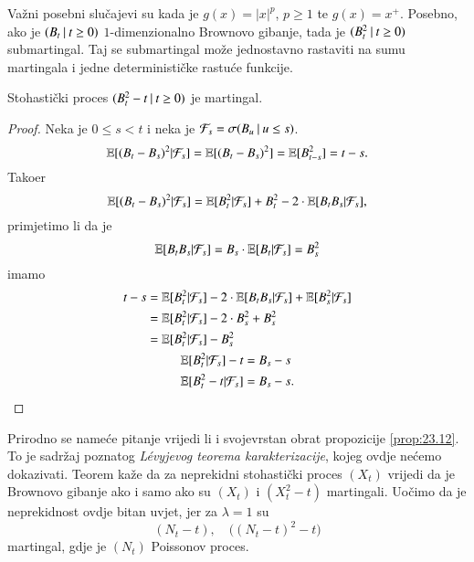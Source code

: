 Va\v zni posebni slu\v cajevi su kada je $g(x) = |x|^p$, $p \geq 1$ te $g(x) = x^+$.
Posebno, ako je $({B_t} \: | \: {t \geq 0})$ $1$-dimenzionalno Brownovo gibanje, tada je $({B_t^2} \: | \: {t \geq 0})$ submartingal.
Taj se submartingal mo\v ze jednostavno rastaviti na sumu martingala i jedne deterministi\v cke rastu\' ce funkcije.

\begin{prop}    \label{prop:23.12}
    Stohasti\v cki proces $({B_t^2 - t} \: | \: {t \geq 0})$ je martingal.
\end{prop}

\begin{proof}
    Neka je $0 \leq s < t$ i neka je $\mathcal{F}_s = \sigma({B_u} \: | \: {u \leq s})$.
    \begin{equation*}
        \mathbb{E} [ (B_t - B_s)^2 | \mathcal{F}_s] = \mathbb{E} [(B_t - B_s)^2] = \mathbb{E} [B_{t - s}^2] = t - s.
    \end{equation*}
    Tako\dj er
    \begin{equation*}
        \mathbb{E} [(B_t - B_s)^2 | \mathcal{F}_s] = \mathbb{E} [B_t^2 | \mathcal{F}_s] + B_t^2 - 2 \cdot \mathbb{E} [B_t B_s | \mathcal{F}_s],
    \end{equation*}
    primjetimo li da je
    \begin{equation*}
        \mathbb{E} [B_t B_s | \mathcal{F}_s] = B_s \cdot \mathbb{E} [B_t | \mathcal{F}_s] = B_s^2
    \end{equation*}
    imamo
    \begin{equation*}
        \begin{gathered}
            \begin{aligned}
                t - s &= \mathbb{E} [B_t^2 | \mathcal{F}_s] - 2 \cdot \mathbb{E} [B_t B_s | \mathcal{F}_s] + \mathbb{E} [B_s^2 | \mathcal{F}_s]\\
                &= \mathbb{E} [B_t^2 | \mathcal{F}_s] - 2 \cdot B_s^2 + B_s^2\\
                &= \mathbb{E} [B_t^2 | \mathcal{F}_s] - B_s^2
            \end{aligned}\\
            \begin{aligned}
                \mathbb{E} [B_t^2 | \mathcal{F}_s] - t &= B_s - s\\
                \mathbb{E} [B_t^2 - t | \mathcal{F}_s] &= B_s - s.
            \end{aligned}
        \end{gathered}
    \end{equation*}
\end{proof}

\begin{nap} \label{nap:23.13}
    Prirodno se name\' ce pitanje vrijedi li i svojevrstan obrat propozicije \ref{prop:23.12}.
    To je sadr\v zaj poznatog \emph{L\' evyjevog teorema karakterizacije}, kojeg ovdje ne\' cemo dokazivati.
    Teorem ka\v ze da za neprekidni stohasti\v cki proces $(X_t)$ vrijedi da je Brownovo gibanje ako i samo ako su $(X_t)$ i $(X_t^2 - t)$ martingali.
    Uo\v cimo da je neprekidnost ovdje bitan uvjet, jer za $\lambda = 1$ su
    \begin{equation*}
        (N_t - t), \quad \big( (N_t - t)^2 - t \big)
    \end{equation*}
    martingal, gdje je $(N_t)$ Poissonov proces.
\end{nap}

